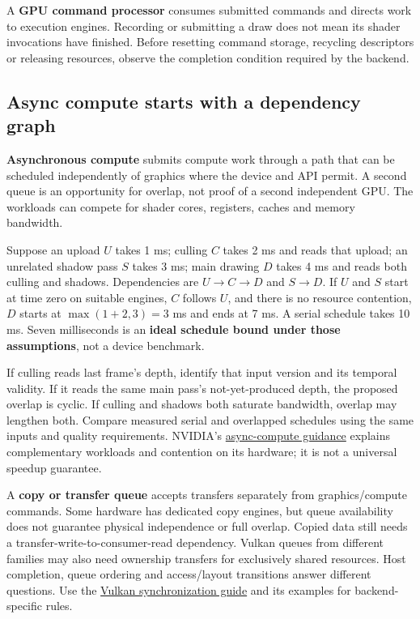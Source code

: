 A \textbf{GPU command processor} consumes submitted commands and directs work to execution engines. Recording or submitting a draw does not mean its shader invocations have finished. Before resetting command storage, recycling descriptors or releasing resources, observe the completion condition required by the backend.

\subsection{Async compute starts with a dependency graph}\label{03-visual-computing-i-ch016-async-compute-starts-with-a-dependency-graph}

\hypertarget{03-visual-computing-i-ch016-async-compute-starts-with-a-dependency-graph}{}

\textbf{Asynchronous compute} submits compute work through a path that can be scheduled independently of graphics where the device and API permit. A second queue is an opportunity for overlap, not proof of a second independent GPU. The workloads can compete for shader cores, registers, caches and memory bandwidth.

Suppose an upload \(U\) takes 1 ms; culling \(C\) takes 2 ms and reads that upload; an unrelated shadow pass \(S\) takes 3 ms; main drawing \(D\) takes 4 ms and reads both culling and shadows. Dependencies are \(U\to C\to D\) and \(S\to D\). If \(U\) and \(S\) start at time zero on suitable engines, \(C\) follows \(U\), and there is no resource contention, \(D\) starts at \(\max(1+2,3)=3\) ms and ends at 7 ms. A serial schedule takes 10 ms. Seven milliseconds is an \textbf{ideal schedule bound under those assumptions}, not a device benchmark.

If culling reads last frame's depth, identify that input version and its temporal validity. If it reads the same main pass's not-yet-produced depth, the proposed overlap is cyclic. If culling and shadows both saturate bandwidth, overlap may lengthen both. Compare measured serial and overlapped schedules using the same inputs and quality requirements. NVIDIA's \href{https://developer.nvidia.com/blog/advanced-api-performance-async-compute-and-overlap/}{async-compute guidance} explains complementary workloads and contention on its hardware; it is not a universal speedup guarantee.

A \textbf{copy or transfer queue} accepts transfers separately from graphics/compute commands. Some hardware has dedicated copy engines, but queue availability does not guarantee physical independence or full overlap. Copied data still needs a transfer-write-to-consumer-read dependency. Vulkan queues from different families may also need ownership transfers for exclusively shared resources. Host completion, queue ordering and access/layout transitions answer different questions. Use the \href{https://docs.vulkan.org/guide/latest/synchronization.html}{Vulkan synchronization guide} and its examples for backend-specific rules.

